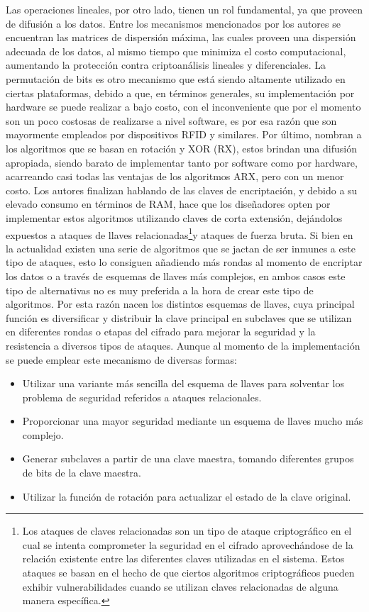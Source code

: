 \documentclass[a4paper,10pt]{article}
\begin{document}
	Las operaciones lineales, por otro lado, tienen un rol fundamental, ya que proveen de difusión a los datos. Entre los mecanismos mencionados por los autores se encuentran las matrices de dispersión máxima, las cuales proveen una dispersión adecuada de los datos, al mismo tiempo que minimiza el costo computacional, aumentando la protección contra criptoanálisis lineales y diferenciales. La permutación de bits es otro mecanismo que está siendo altamente utilizado en ciertas plataformas, debido a que, en términos generales, su implementación por hardware se puede realizar a bajo costo, con el inconveniente que por el momento son un poco costosas de realizarse a nivel software, es por esa razón que son mayormente empleados por dispositivos RFID y similares. Por último, nombran a los algoritmos que se basan en rotación y XOR (RX), estos brindan una difusión apropiada, siendo barato de implementar tanto por software como por hardware, acarreando casi todas las ventajas de los algoritmos ARX, pero con un menor costo.
	Los autores finalizan hablando de las claves de encriptación, y debido a su elevado consumo en términos de RAM, hace que los diseñadores opten por implementar estos algoritmos utilizando claves de corta extensión, dejándolos expuestos a ataques de llaves relacionadas\footnote{Los ataques de claves relacionadas son un tipo de ataque criptográfico en el cual se intenta comprometer la seguridad en el cifrado aprovechándose de la relación existente entre las diferentes claves utilizadas en el sistema. Estos ataques se basan en el hecho de que ciertos algoritmos criptográficos pueden exhibir vulnerabilidades cuando se utilizan claves relacionadas de alguna manera específica.}y ataques de fuerza bruta. Si bien en la actualidad existen una serie de algoritmos que se jactan de ser inmunes a este tipo de ataques, esto lo consiguen añadiendo más rondas al momento de encriptar los datos o a través de esquemas de llaves más complejos, en ambos casos este tipo de alternativas no es muy preferida a la hora de crear este tipo de algoritmos. Por esta razón nacen los distintos esquemas de llaves, cuya principal función es diversificar y distribuir la clave principal en subclaves que se utilizan en diferentes rondas o etapas del cifrado para mejorar la seguridad y la resistencia a diversos tipos de ataques. Aunque al momento de la implementación se puede emplear este mecanismo de diversas formas:
	\begin{itemize}
		\item Utilizar una variante más sencilla del esquema de llaves para solventar los problema de seguridad referidos a ataques relacionales.
		\item Proporcionar una mayor seguridad mediante un esquema de llaves mucho más complejo.
		\item Generar subclaves a partir de una clave maestra, tomando diferentes grupos de bits de la clave maestra.
		\item Utilizar la función de rotación para actualizar el estado de la clave original.
	\end{itemize}
\end{document}
